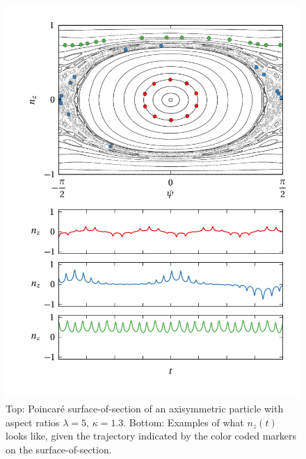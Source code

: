 \documentclass[thesis.tex]{subfiles}
\begin{document}
\begin{figure}
\centering
\includegraphics[width=12cm]{figs/poincare1o30.png}%
\caption{\label{fig:poincare1o30} Top: Poincar\'e surface-of-section of an axisymmetric particle with aspect ratios $\lambda=5$, $\kappa=1.3$. Bottom: Examples of what $n_z(t)$ looks like, given the trajectory indicated by the color coded markers on the surface-of-section. 
}
\end{figure}
\end{document}
